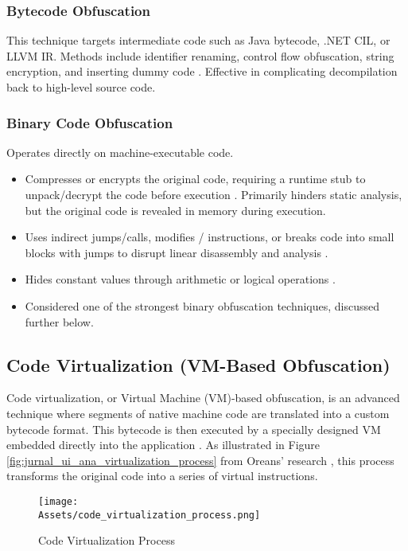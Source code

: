 \subsubsection{Bytecode Obfuscation}
This technique targets intermediate code such as Java bytecode, .NET CIL, or LLVM IR. Methods include identifier renaming, control flow obfuscation, string encryption, and inserting dummy code \cite{Pie18, Yak20}. Effective in complicating decompilation back to high-level source code.

\subsubsection{Binary Code Obfuscation}
Operates directly on machine-executable code.
\begin{itemize}
    \item {} Compresses or encrypts the original code, requiring a runtime stub to unpack/decrypt the code before execution \cite{Rou13}. Primarily hinders static analysis, but the original code is revealed in memory during execution.
    \item {} Uses indirect jumps/calls, modifies / instructions, or breaks code into small blocks with jumps to disrupt linear disassembly and analysis \cite{Rou13}.
    \item {} Hides constant values through arithmetic or logical operations \cite{Rou13}.
    \item {} Considered one of the strongest binary obfuscation techniques, discussed further below.
\end{itemize}

\subsection{Code Virtualization (VM-Based Obfuscation)}
Code virtualization, or Virtual Machine (VM)-based obfuscation, is an advanced technique where segments of native machine code are translated into a custom bytecode format. This bytecode is then executed by a specially designed VM embedded directly into the application \cite{Ore06, Zho24}. As illustrated in Figure \ref{fig:jurnal_ui_ana_virtualization_process} from Oreans' research \cite{Ore06}, this process transforms the original code into a series of virtual instructions.

\begin{figure}[H]
	\centering
	\texttt{[image: \\Assets/code\_virtualization\_process.png]} %
	\caption{Code Virtualization Process \cite{Ore06}}
	\label{fig:jurnal_ui_ana_virtualization_process_en} %
\end{figure}

